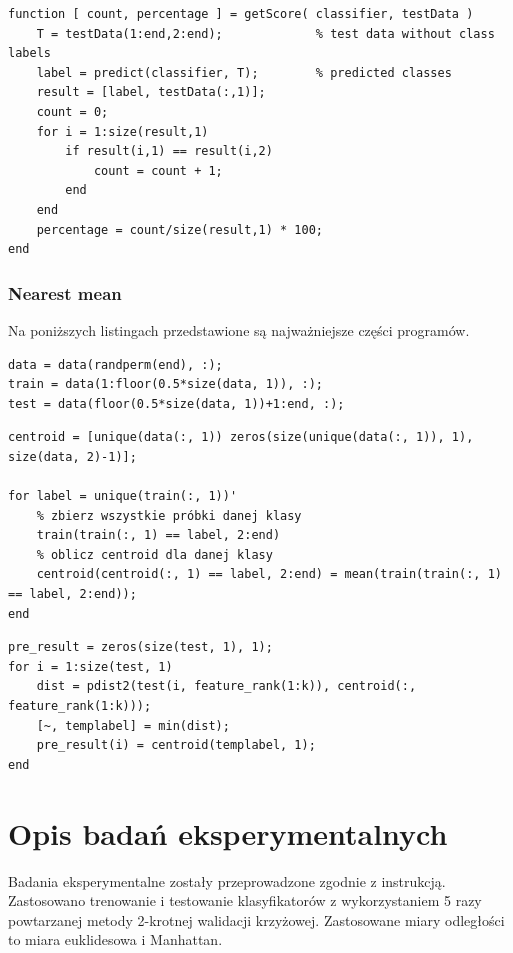 \documentclass[11pt, a4paper, titlepage]{report}
\begin{document}
\begin{lstlisting}[label={lst:knn_test},caption={Testowanie oraz badanie jakości klasyfikatora kNN.}]
function [ count, percentage ] = getScore( classifier, testData )
    T = testData(1:end,2:end);             % test data without class labels
    label = predict(classifier, T);        % predicted classes
    result = [label, testData(:,1)];
    count = 0;
    for i = 1:size(result,1)
        if result(i,1) == result(i,2)
            count = count + 1;
        end
    end
    percentage = count/size(result,1) * 100;
end
\end{lstlisting}
\subsection{Nearest mean}
\label{subs:Nearest mean}
Na poniższych listingach przedstawione są najważniejsze części programów.

\begin{lstlisting}[label={lst:podzial},caption={Podział danych na zbiór uczący i testowy.}]
data = data(randperm(end), :);
train = data(1:floor(0.5*size(data, 1)), :);
test = data(floor(0.5*size(data, 1))+1:end, :);
\end{lstlisting}

\begin{lstlisting}[label={lst:centroidy},caption={Etap treningu - wyznaczanie centroidów.}]
centroid = [unique(data(:, 1)) zeros(size(unique(data(:, 1)), 1), size(data, 2)-1)];

for label = unique(train(:, 1))'
    % zbierz wszystkie próbki danej klasy
    train(train(:, 1) == label, 2:end)
    % oblicz centroid dla danej klasy
    centroid(centroid(:, 1) == label, 2:end) = mean(train(train(:, 1) == label, 2:end));
end
\end{lstlisting}

\begin{lstlisting}[label={lst:pre_result},caption={Wyznaczenie odległości próbki od centroida i przydzielenie do klasy.}]
pre_result = zeros(size(test, 1), 1);
for i = 1:size(test, 1)
    dist = pdist2(test(i, feature_rank(1:k)), centroid(:, feature_rank(1:k)));
    [~, templabel] = min(dist);
    pre_result(i) = centroid(templabel, 1);
end
\end{lstlisting}

\chapter{Opis badań eksperymentalnych}
\label{chap:Opis badań eksperymentalnych}
Badania eksperymentalne zostały przeprowadzone zgodnie z instrukcją. Zastosowano trenowanie i testowanie klasyfikatorów z wykorzystaniem 5 razy powtarzanej metody 2-krotnej walidacji krzyżowej. Zastosowane miary odległości to miara euklidesowa i Manhattan.
\end{document}
